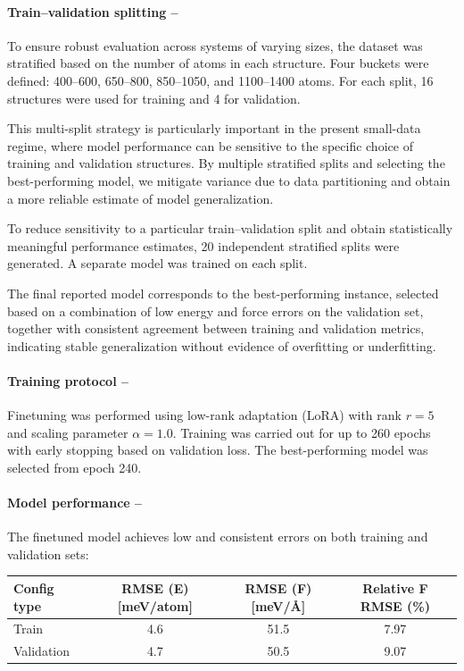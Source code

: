\documentclass[12pt,a4paper,oneside]{book}
\begin{document}
\paragraph{Train--validation splitting --}
\label{para:it0_splitting}
To ensure robust evaluation across systems of varying sizes, the dataset was stratified based on the number of atoms in each structure. Four buckets were defined: 400--600, 650--800, 850--1050, and 1100--1400 atoms. For each split, 16 structures were used for training and 4 for validation.

This multi-split strategy is particularly important in the present small-data regime, where model performance can be sensitive to the specific choice of training and validation structures. By multiple stratified splits and selecting the best-performing model, we mitigate variance due to data partitioning and obtain a more reliable estimate of model generalization.

To reduce sensitivity to a particular train--validation split and obtain statistically meaningful performance estimates, 20 independent stratified splits were generated. A separate model was trained on each split.

The final reported model corresponds to the best-performing instance, selected based on a combination of low energy and force errors on the validation set, together with consistent agreement between training and validation metrics, indicating stable generalization without evidence of overfitting or underfitting.

\paragraph{Training protocol --}
Finetuning was performed using low-rank adaptation (LoRA) with rank $r=5$ and scaling parameter $\alpha = 1.0$. Training was carried out for up to 260 epochs with early stopping based on validation loss. The best-performing model was selected from epoch 240.

\paragraph{Model performance --}
The finetuned model achieves low and consistent errors on both training and validation sets:

\begin{center}
\begin{tabular}{lccc}
\hline
Config type & RMSE (E) [meV/atom] & RMSE (F) [meV/\AA] & Relative F RMSE (\%) \\
\hline
Train & 4.6 & 51.5 & 7.97 \\
Validation & 4.7 & 50.5 & 9.07 \\
\hline
\end{tabular}
\end{center}
\end{document}
